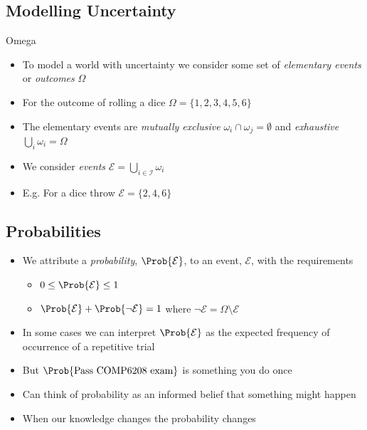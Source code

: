\begin{slide}
\section{Modelling Uncertainty}

\begin{PauseHighLight}
  \begin{rightImage}{Omega}
    \begin{itemize}
    \item To model a world with uncertainty we consider some set of
      \emph{elementary events} or \emph{outcomes} $\Omega$\pause
    \item For the outcome of rolling a dice $\Omega=\{1,2,3,4,5,6\}$\pause
    \item The elementary events are \emph{mutually exclusive}
      $\omega_i\cap\omega_j=\emptyset$ and \emph{exhaustive} $\bigcup_i \omega_i=
      \Omega$ \pause
    \item We consider \emph{events} $\mathcal{E}=
      \bigcup\limits_{i\in\mathcal{I}}\omega_i$\pause
    \item E.g. For a dice throw $\mathcal{E} = \{2,4,6\}$\pause
    \end{itemize}
  \end{rightImage}
\end{PauseHighLight}

\end{slide}


\begin{slide}
\section[-2]{Probabilities}
  
\begin{PauseHighLight}
  \begin{itemize}
  \item We attribute a \emph{probability}, $\Prob{\mathcal{E}}$, to an event,
    $\mathcal{E}$, with the requirements
    \begin{itemize}
    \item $0\leq \Prob{\mathcal{E}} \leq 1$\pause
    \item $\Prob{\mathcal{E}} + \Prob{\neg\mathcal{E}} = 1$ where
      $\neg\mathcal{E} = \Omega \setminus \mathcal{E}$\pause
    \end{itemize}
  \item In some cases we can interpret $\Prob{\mathcal{E}}$ as the
    expected frequency of occurrence of a repetitive trial\pause
  \item But $\Prob{\text{Pass COMP6208 exam}}$ is something you do
    once\pause
  \item Can think of probability as an informed belief that something
    might happen\pause
  \item When our knowledge changes the probability changes\pause
  \end{itemize}
\end{PauseHighLight}

\end{slide}

